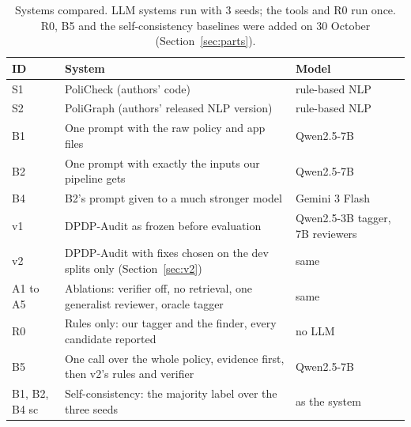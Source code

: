 \documentclass[11pt,a4paper]{article}
\begin{document}
\begin{table}[H]
\centering
\small
\begin{tabular}{lp{7.2cm}l}
\toprule
ID & System & Model \\
\midrule
S1 & PoliCheck (authors' code) & rule-based NLP \\
S2 & PoliGraph (authors' released NLP version) & rule-based NLP \\
B1 & One prompt with the raw policy and app files & Qwen2.5-7B \\
B2 & One prompt with exactly the inputs our pipeline gets & Qwen2.5-7B \\
B4 & B2's prompt given to a much stronger model & Gemini 3 Flash \\
v1 & DPDP-Audit as frozen before evaluation & Qwen2.5-3B tagger, 7B reviewers \\
v2 & DPDP-Audit with fixes chosen on the dev splits only (Section~\ref{sec:v2}) & same \\
A1 to A5 & Ablations: verifier off, no retrieval, one generalist reviewer, oracle tagger & same \\
R0 & Rules only: our tagger and the finder, every candidate reported & no LLM \\
B5 & One call over the whole policy, evidence first, then v2's rules and verifier & Qwen2.5-7B \\
B1, B2, B4 sc & Self-consistency: the majority label over the three seeds & as the system \\
\bottomrule
\end{tabular}
\caption{Systems compared. LLM systems run with 3 seeds; the tools and R0 run once. R0, B5 and the
self-consistency baselines were added on 30 October (Section~\ref{sec:parts}).}
\end{table}
\end{document}
